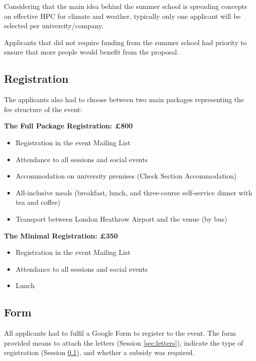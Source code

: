 Considering that the main idea behind the summer school is spreading concepts on effective HPC for climate and weather, typically only one applicant will be selected per university/company.

Applicants that did not require funding from the summer school had priority to ensure that more people would benefit from the proposal.

\subsection{Registration}
\label{sec:registration}

The applicants also had to choose between two main packages representing the fee structure of the event:

\textbf{The Full Package Registration: £800}

\begin{itemize}

\item Registration in the event Mailing List
\item Attendance to all sessions and social events
\item Accommodation on university premises (Check Section Accommodation)
\item All-inclusive meals (breakfast, lunch, and three-course self-service dinner with tea and coffee)
\item Transport between London Heathrow Airport and the venue (by bus)

\end{itemize}

\textbf{The Minimal Registration: £350}

\begin{itemize}

\item Registration in the event Mailing List
\item Attendance to all sessions and social events
\item Lunch

\end{itemize}

\subsection{Form}

All applicants had to fulfil a Google Form to register to the event. The form provided means to attach the letters (Session \ref{sec:letters}), indicate the type of registration (Session \ref{sec:registration}), and  whether a subsidy was required.

